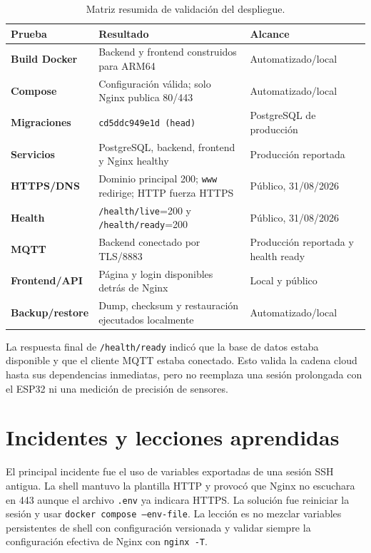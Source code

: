 \documentclass[12pt,a4paper,oneside]{report}
\newcommand{\code}[1]{\texttt{\small #1}}
\begin{document}
\begin{table}[ht]
\centering
\small
\begin{tabularx}{\textwidth}{>{\bfseries}l X l}
\toprule
Prueba & Resultado & Alcance \\
\midrule
Build Docker & Backend y frontend construidos para ARM64 & Automatizado/local \\
Compose & Configuración válida; solo Nginx publica 80/443 & Automatizado/local \\
Migraciones & \code{cd5ddc949e1d (head)} & PostgreSQL de producción \\
Servicios & PostgreSQL, backend, frontend y Nginx healthy & Producción reportada \\
HTTPS/DNS & Dominio principal 200; \code{www} redirige; HTTP fuerza HTTPS & Público, 31/08/2026 \\
Health & \code{/health/live}=200 y \code{/health/ready}=200 & Público, 31/08/2026 \\
MQTT & Backend conectado por TLS/8883 & Producción reportada y health ready \\
Frontend/API & Página y login disponibles detrás de Nginx & Local y público \\
Backup/restore & Dump, checksum y restauración ejecutados localmente & Automatizado/local \\
\bottomrule
\end{tabularx}
\caption{Matriz resumida de validación del despliegue.}
\end{table}

La respuesta final de \code{/health/ready} indicó que la base de datos estaba
disponible y que el cliente MQTT estaba conectado. Esto valida la cadena cloud
hasta sus dependencias inmediatas, pero no reemplaza una sesión prolongada con el
ESP32 ni una medición de precisión de sensores.

\section{Incidentes y lecciones aprendidas}

El principal incidente fue el uso de variables exportadas de una sesión SSH
antigua. La shell mantuvo la plantilla HTTP y provocó que Nginx no escuchara en
443 aunque el archivo \code{.env} ya indicara HTTPS. La solución fue reiniciar la
sesión y usar \code{docker compose --env-file}. La lección es no mezclar variables
persistentes de shell con configuración versionada y validar siempre la
configuración efectiva de Nginx con \code{nginx -T}.
\end{document}
